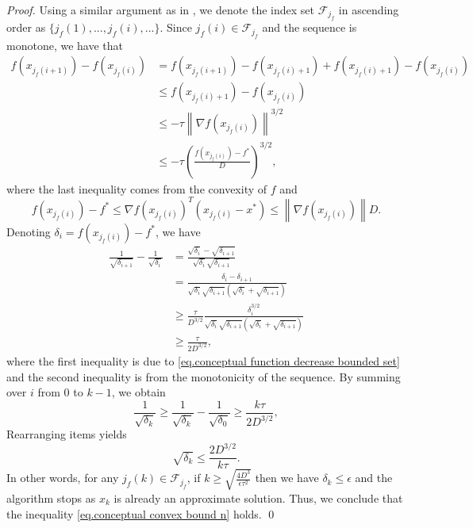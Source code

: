 \begin{proof}
    Using a similar argument as in , we denote the index set $\mathcal{F}_{j_f}$ in ascending order as $\{j_f(1), ..., j_f(i), ...\}$.
    Since $j_f(i)\in\mathcal{F}_{j_f}$ and the sequence is monotone, we have that
        \begin{equation}
    \begin{aligned}
        f(x_{j_f(i+1)}) - f(x_{j_f(i)}) &= f(x_{j_f(i+1)}) -f(x_{j_f(i)+1})+f(x_{j_f(i)+1})- f(x_{j_f(i)})\\
        &\leq f(x_{j_f(i)+1})- f(x_{j_f(i)}) \\
        &\leq -\tau \left\|\nabla f(x_{j_f(i)})\right\|^{3/2}\\
        &\leq -\tau \left ( \frac{ f(x_{j_f(i)})-f^*} {D}\right)^{3/2}, \label{eq.conceptual function decrease bounded set}
        \end{aligned}
    \end{equation}
    where the last inequality comes from the convexity of $f$ and
    \begin{equation*}
        f(x_{j_f(i)})-f^* \leq \nabla f(x_{j_f(i)})^T (x_{j_f(i)}-x^*) \leq \left\|\nabla f(x_{j_f(i)})\right\| D.
    \end{equation*}
    Denoting $\delta_i = f(x_{j_f(i)}) - f^*$, we have
    \begin{align*}
        \frac{1}{\sqrt{\delta_{i+1}}}-\frac{1}{\sqrt{\delta_i}} & =\frac{\sqrt{\delta_i}-\sqrt{\delta_{i+1}}}{\sqrt{\delta_i}\sqrt{\delta_{i+1}}}                                                       \\
                                                                & =\frac{\delta_i-\delta_{i+1}}{\sqrt{\delta_i}\sqrt{\delta_{i+1}}(\sqrt{\delta_i}+\sqrt{\delta_{i+1}})}                                \\
                                                                & \geq \frac{\tau}{D^{3/2}}\frac{\delta_{i}^{3/2}}{\sqrt{\delta_i}\sqrt{\delta_{i+1}}\left (\sqrt{\delta_i}+\sqrt{\delta_{i+1}}\right)} \\
                                                                & \geq \frac{\tau}{2D^{3/2}},
    \end{align*}
    where the first inequality is due to \eqref{eq.conceptual function decrease bounded set} and the second inequality is from the monotonicity of the sequence. By summing over $i$ from $0$ to $k-1$, we obtain
    \begin{equation*}
       \frac{1}{\sqrt{\delta_k}} \ge \frac{1}{\sqrt{\delta_k}}-\frac{1}{\sqrt{\delta_0}} \geq \frac{k\tau}{2D^{3/2}},
    \end{equation*}
    Rearranging items yields
    \begin{equation*}
        \sqrt{\delta_k}\leq \frac{2D^{3/2}}{k\tau}.
    \end{equation*}
    In other words, for any $j_f(k) \in \mathcal F_{j_f}$,  if 
    $k \ge \sqrt{\frac{4D^3}{\epsilon\tau^2}}$ then we have $\delta_k \le \epsilon$ and the algorithm stops as $x_k$ is already an approximate solution. Thus, we conclude that the inequality \eqref{eq.conceptual convex bound n} holds.
\smartqed \qed \end{proof}

